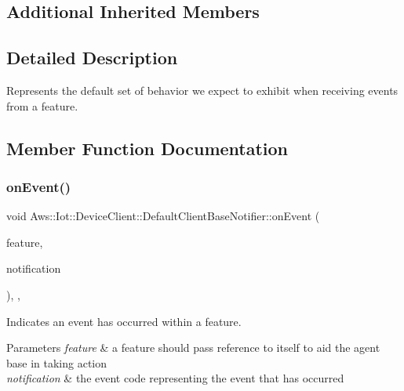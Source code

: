 \subsection*{Additional Inherited Members}


\subsection{Detailed Description}
Represents the default set of behavior we expect to exhibit when receiving events from a feature. 

\subsection{Member Function Documentation}
\mbox{\label{class_aws_1_1_iot_1_1_device_client_1_1_default_client_base_notifier_a78ef5a78282bedbfce408e34ebb6a542}} 
\subsubsection{\texorpdfstring{on\+Event()}{onEvent()}}
{\footnotesize\ttfamily void Aws\+::\+Iot\+::\+Device\+Client\+::\+Default\+Client\+Base\+Notifier\+::on\+Event (\begin{DoxyParamCaption}\item[{\hyperlink{class_aws_1_1_iot_1_1_device_client_1_1_feature}{Feature} $\ast$}]{feature,  }\item[{Client\+Base\+Event\+Notification}]{notification }\end{DoxyParamCaption})\hspace{0.3cm}{\ttfamily [inline]}, {\ttfamily [private]}, {\ttfamily [virtual]}}



Indicates an event has occurred within a feature. 


\begin{DoxyParams}{Parameters}
{\em feature} & a feature should pass reference to itself to aid the agent base in taking action \\
\hline
{\em notification} & the event code representing the event that has occurred \\
\hline
\end{DoxyParams}


